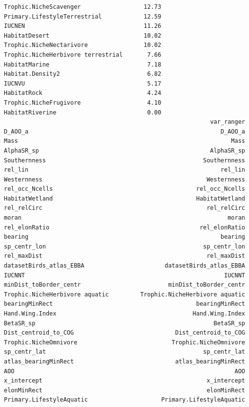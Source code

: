 \documentclass[
  letterpaper,
  DIV=11,
  numbers=noendperiod]{scrreprt}
\begin{document}
\begin{verbatim}
Trophic.NicheScavenger                  12.73
Primary.LifestyleTerrestrial            12.59
IUCNEN                                  11.26
HabitatDesert                           10.02
Trophic.NicheNectarivore                10.02
Trophic.NicheHerbivore terrestrial       7.66
HabitatMarine                            7.18
Habitat.Density2                         6.82
IUCNVU                                   5.17
HabitatRock                              4.24
Trophic.NicheFrugivore                   4.10
HabitatRiverine                          0.00
                                                           var_ranger
D_AOO_a                                                       D_AOO_a
Mass                                                             Mass
AlphaSR_sp                                                 AlphaSR_sp
Southernness                                             Southernness
rel_lin                                                       rel_lin
Westernness                                               Westernness
rel_occ_Ncells                                         rel_occ_Ncells
HabitatWetland                                         HabitatWetland
rel_relCirc                                               rel_relCirc
moran                                                           moran
rel_elonRatio                                           rel_elonRatio
bearing                                                       bearing
sp_centr_lon                                             sp_centr_lon
rel_maxDist                                               rel_maxDist
datasetBirds_atlas_EBBA                       datasetBirds_atlas_EBBA
IUCNNT                                                         IUCNNT
minDist_toBorder_centr                         minDist_toBorder_centr
Trophic.NicheHerbivore aquatic         Trophic.NicheHerbivore aquatic
bearingMinRect                                         bearingMinRect
Hand.Wing.Index                                       Hand.Wing.Index
BetaSR_sp                                                   BetaSR_sp
Dist_centroid_to_COG                             Dist_centroid_to_COG
Trophic.NicheOmnivore                           Trophic.NicheOmnivore
sp_centr_lat                                             sp_centr_lat
atlas_bearingMinRect                             atlas_bearingMinRect
AOO                                                               AOO
x_intercept                                               x_intercept
elonMinRect                                               elonMinRect
Primary.LifestyleAquatic                     Primary.LifestyleAquatic

\end{verbatim}
\end{document}
